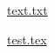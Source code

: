 \documentclass{article}
\begin{document}
\href{/static/text.txt}{text.txt}

\href{/static/test.tex}{test.tex}
\end{document}
